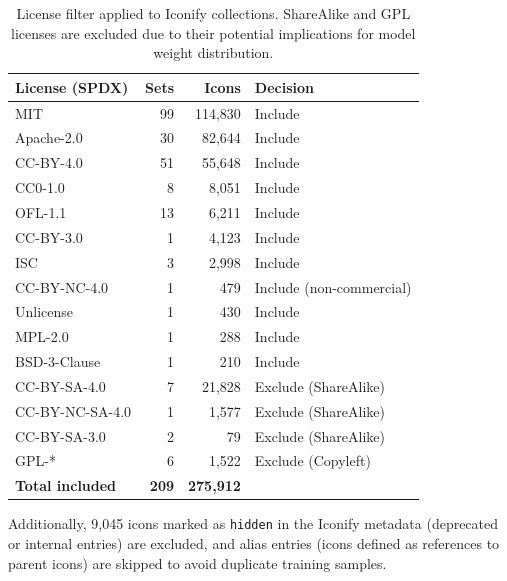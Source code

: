 \begin{table}[h]
\centering
\caption{License filter applied to Iconify collections. ShareAlike and GPL
licenses are excluded due to their potential implications for model weight
distribution.}
\label{tab:licenses}
\begin{tabular}{lrrl}
\toprule
\textbf{License (SPDX)} & \textbf{Sets} & \textbf{Icons} & \textbf{Decision} \\
\midrule
MIT           & 99 & 114,830 & \textcolor{brandteal}{Include} \\
Apache-2.0    & 30 &  82,644 & \textcolor{brandteal}{Include} \\
CC-BY-4.0     & 51 &  55,648 & \textcolor{brandteal}{Include} \\
CC0-1.0       &  8 &   8,051 & \textcolor{brandteal}{Include} \\
OFL-1.1       & 13 &   6,211 & \textcolor{brandteal}{Include} \\
CC-BY-3.0     &  1 &   4,123 & \textcolor{brandteal}{Include} \\
ISC           &  3 &   2,998 & \textcolor{brandteal}{Include} \\
CC-BY-NC-4.0  &  1 &     479 & \textcolor{green!60!black}{Include (non-commercial)} \\
Unlicense     &  1 &     430 & \textcolor{brandteal}{Include} \\
MPL-2.0       &  1 &     288 & \textcolor{brandteal}{Include} \\
BSD-3-Clause  &  1 &     210 & \textcolor{brandteal}{Include} \\
\midrule
CC-BY-SA-4.0  &  7 &  21,828 & \textcolor{brandpink}{Exclude (ShareAlike)} \\
CC-BY-NC-SA-4.0 & 1 & 1,577 & \textcolor{brandpink}{Exclude (ShareAlike)} \\
CC-BY-SA-3.0  &  2 &      79 & \textcolor{brandpink}{Exclude (ShareAlike)} \\
GPL-*         &  6 &   1,522 & \textcolor{brandpink}{Exclude (Copyleft)} \\
\midrule
\textbf{Total included} & \textbf{209} & \textbf{275,912} & \\
\bottomrule
\end{tabular}
\end{table}

Additionally, 9,045 icons marked as \texttt{hidden} in the Iconify metadata
(deprecated or internal entries) are excluded, and alias entries (icons defined
as references to parent icons) are skipped to avoid duplicate training samples.

